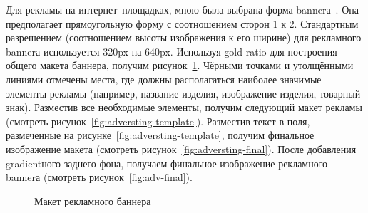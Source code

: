 Для рекламы на интернет--площадках, мною была выбрана форма
\gls{banner}а~\cite{web:wiki-banner}. Она предполагает прямоугольную форму с
соотношением сторон 1 к 2. Стандартным разрешением (соотношением высоты
изображения к его ширине) для рекламного \gls{banner}а используется
320\acrshort{px} на 640\acrshort{px}. Используя \gls{gold-ratio} для построения
общего макета баннера, получим рисунок~\ref{fig:base-template}. Чёрными
точками и утолщёнными линиями отмечены места, где должны располагаться наиболее
значимые элементы рекламы (например, название изделия, изображение изделия,
товарный знак). Разместив все необходимые элементы, получим следующий макет
рекламы (смотреть рисунок~\ref{fig:adversting-template}). Разместив текст в
поля, размеченные на рисунке~\ref{fig:adversting-template}, получим финальное
изображение макета (смотреть рисунок~\ref{fig:adversting-final}). После
добавления \gls{gradient}ного заднего фона, получаем финальное изображение рекламного
\gls{banner}а (смотреть рисунок~\ref{fig:adv-final}).
\begin{figure}[htpb]
    \begin{center}
    \end{center}
    \caption{Макет рекламного баннера}%
    \label{fig:base-template}
\end{figure}

